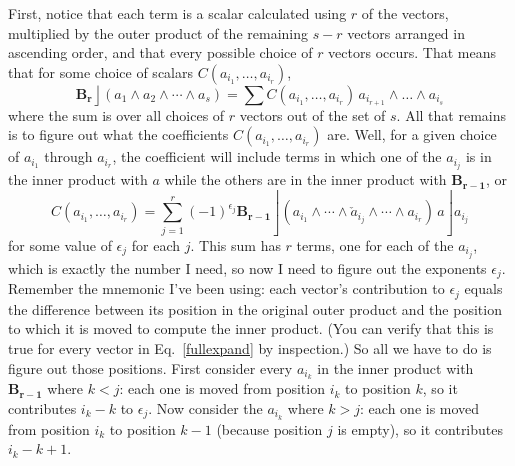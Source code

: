 \documentclass{utarticle}
\newcommand{\bl}[1]{\ensuremath{\bm{#1}}}
\DeclareMathOperator{\lin}{\rfloor}
\DeclareMathOperator{\out}{\wedge}
\begin{document}
First, notice that each term is a scalar calculated using $r$ of the vectors,
multiplied by the outer product of the remaining $s-r$ vectors arranged in 
ascending order, and that every possible choice of $r$ vectors occurs.  That
means that for some choice of scalars $C(a_{i_1}, \dotsc, a_{i_r})$,
\begin{equation}
\bl{B_r} \lin (a_1 \out a_2 \out \dotsb \out a_s) = \sum C(a_{i_1}, \dotsc, a_{i_r}) \, a_{i_{r+1}} \out \dotsc \out a_{i_s} 
\end{equation}
where the sum is over all choices of $r$ vectors out of the set of $s$.
All that remains is to figure out what the coefficients $C(a_{i_1}, \dotsc, a_{i_r})$ 
are.  Well, for a given choice of $a_{i_1}$ through $a_{i_r}$, the coefficient
will include terms in which one of the $a_{i_j}$ is in the inner product with $a$ 
while the others are in the inner product with \bl{B_{r-1}}, or
\begin{equation}
C(a_{i_1}, \dotsc, a_{i_r}) = \sum_{j=1}^r (-1)^{\epsilon_j} \bl{B_{r-1}} \lin 
                                                 (a_{i_1} \out \dotsb \out \check{a}_{i_j} \out \dotsb \out a_{i_r}) \, a \lin a_{i_j}
\label{expandcoeff}
\end{equation}
for some value of $\epsilon_j$ for each $j$.  This sum has $r$ terms, one 
for each of the $a_{i_j}$, which is exactly the number I need, so now I need 
to figure out the exponents $\epsilon_j$.  Remember the mnemonic I've been using:
each vector's contribution to $\epsilon_j$ equals the difference between its position 
in the original outer product and the position to which it is moved to compute the inner 
product.  (You can verify that this is true for every vector in Eq.~\eqref{fullexpand} by 
inspection.)  So all we have to do is figure out those positions.  First consider every 
$a_{i_k}$ in the inner product with \bl{B_{r-1}} where $k < j$: each one is moved from 
position $i_k$ to position $k$, so it contributes $i_k - k$ to $\epsilon_j$.  Now consider 
the $a_{i_k}$ where $k > j$: each one is moved from position $i_k$ to position $k-1$ 
(because position $j$ is empty), so it contributes $i_k - k + 1$.  
\end{document}
